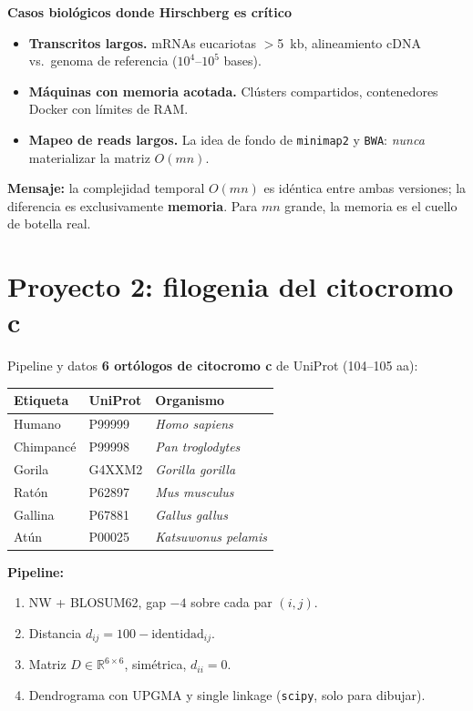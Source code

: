 \documentclass[10pt,aspectratio=169]{beamer}
\begin{document}
\begin{frame}{\textbf{Casos biol\'ogicos donde Hirschberg es cr\'itico}}
\begin{itemize}\setlength\itemsep{0.4em}
  \item \textbf{Transcritos largos.} mRNAs eucariotas $>$5~kb, alineamiento cDNA vs.\ genoma de referencia ($10^4$--$10^5$ bases).
  \item \textbf{M\'aquinas con memoria acotada.} Cl\'usters compartidos, contenedores Docker con l\'imites de RAM.
  \item \textbf{Mapeo de reads largos.} La idea de fondo de \texttt{minimap2} y \texttt{BWA}: \emph{nunca} materializar la matriz $O(mn)$.
\end{itemize}

\bigskip
\textbf{Mensaje:} la complejidad temporal $O(mn)$ es id\'entica entre ambas versiones; la diferencia es exclusivamente \textbf{memoria}. Para $mn$ grande, la memoria es el cuello de botella real.
\end{frame}

\section{Proyecto 2: filogenia del citocromo c}

\begin{frame}{Pipeline y datos}
\textbf{6 ort\'ologos de citocromo c} de UniProt (104--105 aa):
\smallskip
{\small\begin{tabular}{lll}
\toprule
Etiqueta & UniProt & Organismo \\
\midrule
Humano    & P99999 & \emph{Homo sapiens} \\
Chimpanc\'e & P99998 & \emph{Pan troglodytes} \\
Gorila    & G4XXM2 & \emph{Gorilla gorilla} \\
Rat\'on   & P62897 & \emph{Mus musculus} \\
Gallina   & P67881 & \emph{Gallus gallus} \\
At\'un    & P00025 & \emph{Katsuwonus pelamis} \\
\bottomrule
\end{tabular}}

\medskip
\textbf{Pipeline:}
\begin{enumerate}\setlength\itemsep{0.2em}
  \item NW + BLOSUM62, gap $-4$ sobre cada par $(i, j)$.
  \item Distancia $d_{ij} = 100 - \text{identidad}_{ij}$.
  \item Matriz $D \in \mathbb{R}^{6\times 6}$, sim\'etrica, $d_{ii}=0$.
  \item Dendrograma con UPGMA y single linkage (\texttt{scipy}, solo para dibujar).
\end{enumerate}
\end{frame}
\end{document}
